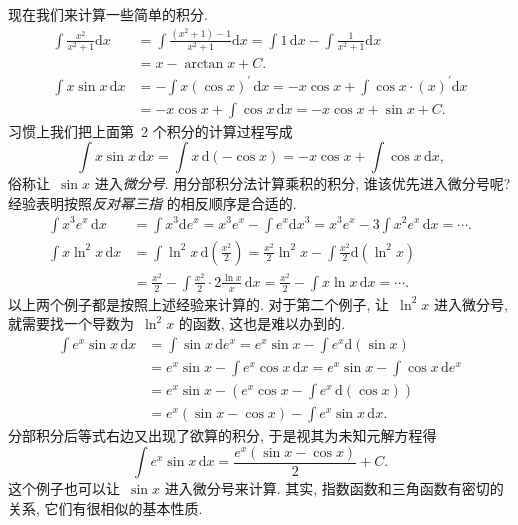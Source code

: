 \documentclass[12pt]{ctexbook}
\theoremstyle{definition}
\theoremstyle{remark}
\begin{document}
现在我们来计算一些简单的积分.%
\begin{align*}
\int\frac{x^{2}}{x^{2}+1}\mathrm{d}x  &  =\int\frac{\left(  x^{2}+1\right)
-1}{x^{2}+1}\mathrm{d}x=\int1\,\mathrm{d}x-\int\frac{1}{x^{2}+1}\mathrm{d}x\\
&  =x-\arctan x+C\text{.}\\
\int x\sin x\,\mathrm{d}x  &  =-\int x\left(  \cos x\right)  ^{\prime
}\,\mathrm{d}x=-x\cos x+\int\cos x\cdot\left(  x\right)  ^{\prime}%
\mathrm{d}x\\
&  =-x\cos x+\int\cos x\,\mathrm{d}x=-x\cos x+\sin x+C\text{.}%
\end{align*}
习惯上我们把上面第~2
个积分的计算过程写成\[
\int x\sin x\,\mathrm{d}x=\int x\,\mathrm{d}\left(  -\cos x\right)  =-x\cos
x+\int\cos x\,\mathrm{d}x\text{,}%
\]
俗称让~$\sin x$
进入\emph{微分号}.
用分部积分法计算乘积的积分,
谁该优先进入微分号呢?
经验表明按照\emph{反对幂三指}%
的相反顺序是合适的.%
\begin{align*}
\int x^{3}e^{x}\,\mathrm{d}x  &  =\int x^{3}\mathrm{d}e^{x}=x^{3}e^{x}-\int
e^{x}\mathrm{d}x^{3}=x^{3}e^{x}-3\int x^{2}e^{x}\,\mathrm{d}x=\cdots\text{.}\\
\int x\ln^{2}x\,\mathrm{d}x  &  =\int\ln^{2}x\,\mathrm{d}\left(  \frac{x^{2}%
}{2}\right)  =\frac{x^{2}}{2}\ln^{2}x-\int\frac{x^{2}}{2}\mathrm{d}\left(
\ln^{2}x\right) \\
&  =\frac{x^{2}}{2}-\int\frac{x^{2}}{2}\cdot2\frac{\ln x}{x}\,\mathrm{d}%
x=\frac{x^{2}}{2}-\int x\ln x\,\mathrm{d}x=\cdots\text{.}%
\end{align*}
以上两个例子都是按照上述经验来计算的.
对于第二个例子, 让~$\ln^{2}x$
进入微分号,
就需要找一个导数为~$\ln
^{2}x$ 的函数,
这也是难以办到的.%
\begin{align*}
\int e^{x}\sin x\,\mathrm{d}x  &  =\int\sin x\,\mathrm{d}e^{x}=e^{x}\sin
x-\int e^{x}\mathrm{d}\left(  \sin x\right) \\
&  =e^{x}\sin x-\int e^{x}\cos x\,\mathrm{d}x=e^{x}\sin x-\int\cos
x\,\mathrm{d}e^{x}\\
&  =e^{x}\sin x-\left(  e^{x}\cos x-\int e^{x}\,\mathrm{d}(\cos x)\right) \\
&  =e^{x}\left(  \sin x-\cos x\right)  -\int e^{x}\sin x\,\mathrm{d}x\text{.}%
\end{align*}
分部积分后等式右边又出现了欲算的积分,
于是视其为未知元解方程得\[
\int e^{x}\sin x\,\mathrm{d}x=\frac{e^{x}\left(  \sin x-\cos x\right)  }%
{2}+C\text{.}%
\]
这个例子也可以让~$\sin x$
进入微分号来计算.
其实,
指数函数和三角函数有密切的关系,
它们有很相似的基本性质.
\end{document}
